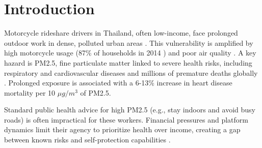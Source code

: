 \section{Introduction}



Motorcycle rideshare drivers in Thailand, often low-income, face prolonged outdoor work in dense, polluted urban areas \cite{tieanklin2024rideshare}.
This vulnerability is amplified by high motorcycle usage (87\% of households in 2014 \cite{Poushter2015motorcyclestat}) and poor air quality \cite{iqr_rank}.
A key hazard is PM2.5, fine particulate matter linked to severe health risks, including respiratory and cardiovascular diseases and millions of premature deaths globally \cite{who_ambient_air_pollution}.
Prolonged exposure is associated with a 6-13\% increase in heart disease mortality per 10 $\mu g/m^3$ of PM2.5.

Standard public health advice for high PM2.5 (e.g., stay indoors and avoid busy roads) \cite{cdc_pm25} is often impractical for these workers.
Financial pressures and platform dynamics limit their agency to prioritize health over income, creating a gap between known risks and self-protection capabilities \cite{tieanklin2024rideshare}.

